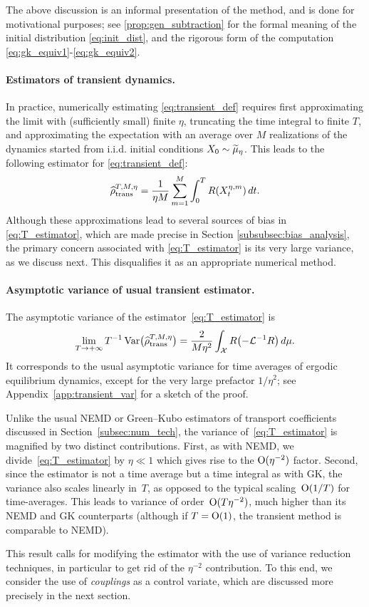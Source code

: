 The above discussion is an informal presentation of the method, and is done for motivational purposes; see \cref{prop:gen_subtraction} for the formal meaning of the initial distribution \eqref{eq:init_dist}, and the rigorous form of the computation \eqref{eq:gk_equiv1}-\eqref{eq:gk_equiv2}.  


\paragraph{Estimators of transient dynamics.} In practice, numerically estimating \eqref{eq:transient_def} requires first approximating the limit with (sufficiently small) finite $\eta$, truncating the time integral to finite $T$, and approximating the expectation with an average over $M$ realizations of the dynamics started from i.i.d. initial conditions $X_0\sim\widetilde{\mu}_\eta$. This leads to the following estimator for \eqref{eq:transient_def}:
%
\begin{equation}
	\widehat{\rho}^{T,M,\eta}_{\rm trans} = \frac{1}{\eta M}\sum_{m=1}^M \int_0^T R(X_t^{\eta,m}) \, dt.	
	\label{eq:T_estimator}
\end{equation}
%
Although these approximations lead to several sources of bias in \eqref{eq:T_estimator}, which are made precise in Section \ref{subsubsec:bias_analysis}, the primary concern associated with \eqref{eq:T_estimator} is its very large variance, as we discuss next. This disqualifies it as an appropriate numerical method.

\paragraph{Asymptotic variance of usual transient estimator.} The asymptotic variance of the estimator~\eqref{eq:T_estimator} is
%
\begin{equation}
	\lim_{T\to+\infty} T^{-1}\Var\bigl(\Test\bigr) = \frac{2}{M\eta^2}\int_\mathcal{X} R\paren*{-\L^{-1} R} \, d\mu.
	\label{eq:asym_var_transient}
\end{equation}
%
It corresponds to the usual asymptotic variance for time averages of ergodic equilibrium dynamics, except for the very large prefactor $1/\eta^2$; see Appendix~\ref{app:transient_var} for a sketch of the proof.

Unlike the usual NEMD or Green--Kubo estimators of transport coefficients discussed in Section~\ref{subsec:num_tech}, the variance of~\eqref{eq:T_estimator} is magnified by two distinct contributions. First, as with NEMD, we divide~\eqref{eq:T_estimator} by $\eta\ll 1$ which gives rise to the $\mathrm{O}(\eta^{-2})$ factor. Second, since the estimator is not a time average but a time integral as with GK, the variance also scales linearly in~$T$, as opposed to the typical scaling~$\mathrm{O}(1/T)$ for time-averages. This leads to variance of order~$\mathrm{O}(T\eta^{-2})$, much higher than its NEMD and GK counterparts (although if $T=\mathrm{O}(1)$, the transient method is comparable to NEMD).

This result calls for modifying the estimator with the use of variance reduction techniques, in particular to get rid of the $\eta^{-2}$ contribution. To this end, we consider the use of \emph{couplings} as a control variate, which are discussed more precisely in the next section.
%







